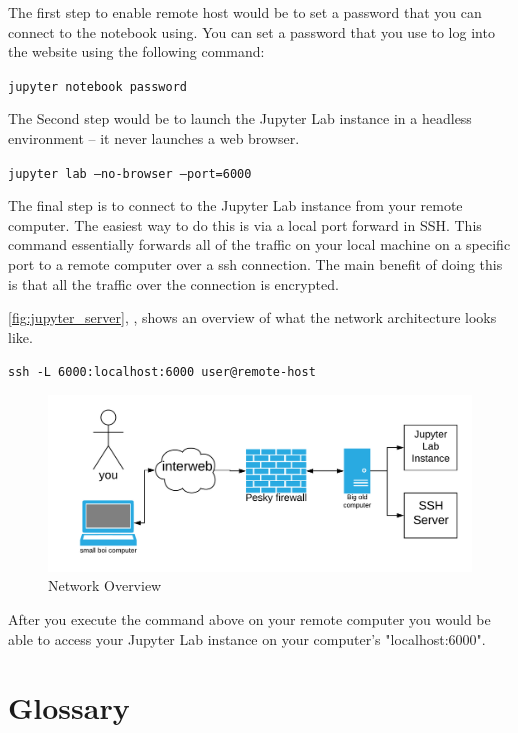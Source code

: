 \documentclass[pdftex,12pt]{artikel3}
\newcommand{\tabfigref}[1]{\autoref{#1}, \nameref{#1},}
\begin{document}
The first step to enable remote host would be to set a password that you can connect to the notebook using. You can set a password that you use to log into the website using the following command:

\texttt{jupyter notebook password}

The Second step would be to launch the Jupyter Lab instance in a headless environment -- it never launches a web browser.

\texttt{jupyter lab --no-browser --port=6000}

The final step is to connect to the Jupyter Lab instance from your
remote computer. The easiest way to do this is via a local port
forward in SSH. This command essentially forwards all of the traffic on your local machine on a specific port to a remote computer over a ssh connection. The main benefit of doing this is that all the traffic over the connection is encrypted.

\tabfigref{fig:jupyter_server} shows an overview of what the network architecture looks like.


\texttt{ssh -L 6000:localhost:6000 user@remote-host}

\begin{figure}[h!]
    \centering
    \includegraphics[width=15cm]{remoteJupyter.png}
    \caption{Network Overview}
    \label{fig:jupyter_server}
\end{figure}

After you execute the command above on your remote computer you
would be able to access your Jupyter Lab instance on your computer's "localhost:6000". 

\newpage

\section{Glossary}
\end{document}
